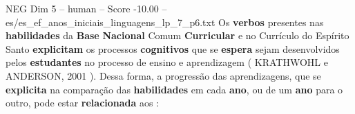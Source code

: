 \begin{textsample}{NEG Dim 5 – human – Score -10.00 – es/es\_ef\_anos\_iniciais\_linguagens\_lp\_7\_p6.txt}  \label{ex:f5_neg_006}
Os \textbf{verbos} presentes nas \textbf{habilidades} da \textbf{Base} \textbf{Nacional} Comum \textbf{Curricular} e no Currículo do Espírito Santo \textbf{explicitam} os processos \textbf{cognitivos} que se \textbf{espera} sejam desenvolvidos pelos \textbf{estudantes} no processo de ensino e aprendizagem ( KRATHWOHL e ANDERSON, 2001 ).
Dessa forma, a progressão das aprendizagens, que se \textbf{explicita} na comparação das \textbf{habilidades} em cada \textbf{ano}, ou de um \textbf{ano} para o outro, pode estar \textbf{relacionada} aos :

\end{textsample}
